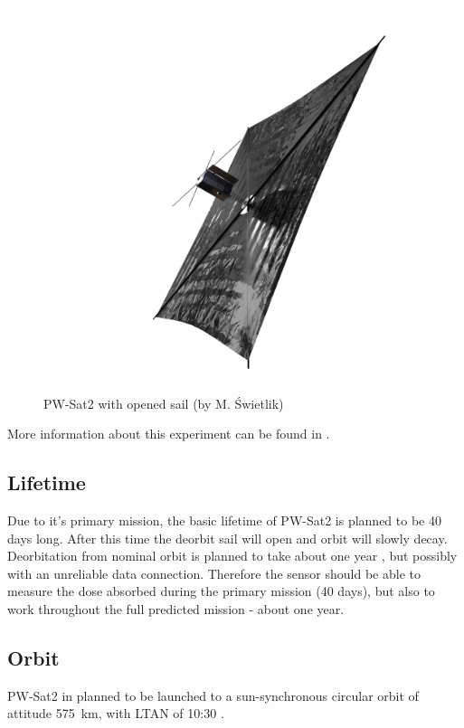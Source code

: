         \begin{figure}[H]
            \centering
            \includegraphics[width=0.7\paperwidth]{img/PW-Sat2_render_02.png}
            \caption{PW-Sat2 with opened sail (by M. Świetlik)}
            \label{PW-Sat_render_sail}
        \end{figure}

        More information about this experiment can be found in \cite{DDC_article}.

    \subsection{Lifetime}
        Due to it's primary mission, the basic lifetime of PW-Sat2 is planned to be 40 days long. After this time the deorbit sail will open and orbit will slowly decay. Deorbitation from nominal orbit is planned to take about one year \cite{PWSAT_MA_CDR}, but possibly with an unreliable data connection. Therefore the sensor should be able to measure the dose absorbed during the primary mission (40 days), but also to work throughout the full predicted mission - about one year.

    \subsection{Orbit}
        PW-Sat2 in planned to be launched to a sun-synchronous circular orbit of attitude \SI{575}{\kilo\meter}, with LTAN of 10:30 \cite{PWSAT_MA_CDR}.


